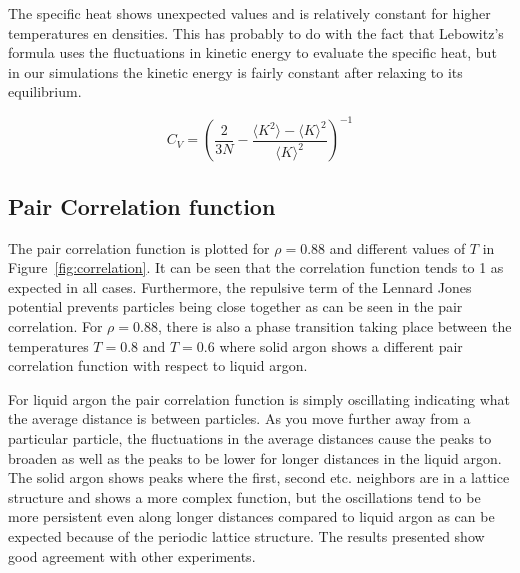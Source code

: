 \documentclass[
10pt, %
a4paper, %
oneside, %
headinclude,footinclude, %
BCOR5mm, %
]{scrartcl}
\begin{document}
The specific heat shows unexpected values and is relatively constant for higher temperatures en densities. This has probably to do with the fact that Lebowitz's formula uses the fluctuations in kinetic energy to evaluate the specific heat, but in our simulations the kinetic energy is fairly constant after relaxing to its equilibrium.




$$ C_V = \left (\frac{2}{3N} - \frac{\langle K^2 \rangle - \langle K \rangle^2}{\langle K\rangle^2} \right )^{-1} $$





\subsection{Pair Correlation function}

The pair correlation function is plotted for $\rho = 0.88$ and different values of $T$ in Figure~\vref{fig:correlation}. It can be seen that the correlation function tends to 1 as expected in all cases. Furthermore, the repulsive term of the Lennard Jones potential prevents particles being close together as can be seen in the pair correlation. For $\rho = 0.88$, there is also a phase transition taking place between the temperatures $T=0.8$ and $T=0.6$ where solid argon shows a different pair correlation function with respect to liquid argon. 

For liquid argon the pair correlation function is simply oscillating indicating what the average distance is between  particles. As you move further away from a particular particle, the fluctuations in the average distances cause the peaks to broaden as well as the peaks to be lower for longer distances in the liquid argon. The solid argon shows peaks where the first, second etc. neighbors are in a lattice structure and shows a more complex function, but the oscillations tend to be more persistent even along longer distances compared to liquid argon as can be expected because of the periodic lattice structure. The results presented show good agreement with other experiments\cite{Thijssen:2013cp}. 

\end{document}
